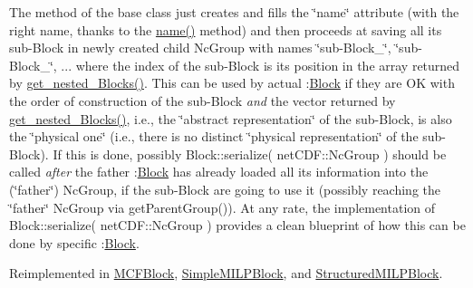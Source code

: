 The method of the base class just creates and fills the \char`\"{}name\char`\"{} attribute (with the right name, thanks to the \mbox{\hyperlink{class_s_m_spp__di__unipi__it_1_1_block_a738e9dfd6e00507da219e4bd5a3f6be9}{name()}} method) and then proceeds at saving all its sub-\/\+Block in newly created child Nc\+Group with names \char`\"{}sub-\/\+Block\+\_\char`\"{}, \char`\"{}sub-\/\+Block\+\_\char`\"{}, ... where the index of the sub-\/\+Block is its position in the array returned by \mbox{\hyperlink{class_s_m_spp__di__unipi__it_1_1_block_a39bc932e28075740f08b392830a67e03}{get\+\_\+nested\+\_\+\+Blocks()}}. This can be used by actual \+:\mbox{\hyperlink{class_s_m_spp__di__unipi__it_1_1_block}{Block}} if they are OK with the order of construction of the sub-\/\+Block {\itshape and} the vector returned by \mbox{\hyperlink{class_s_m_spp__di__unipi__it_1_1_block_a39bc932e28075740f08b392830a67e03}{get\+\_\+nested\+\_\+\+Blocks()}}, i.\+e., the \char`\"{}abstract representation\char`\"{} of the sub-\/\+Block, is also the \char`\"{}physical one\char`\"{} (i.\+e., there is no distinct \char`\"{}physical representation\char`\"{} of the sub-\/\+Block). If this is done, possibly Block\+::serialize( net\+C\+D\+F\+::\+Nc\+Group ) should be called {\itshape after} the father \+:\mbox{\hyperlink{class_s_m_spp__di__unipi__it_1_1_block}{Block}} has already loaded all its information into the (\char`\"{}father\char`\"{}) Nc\+Group, if the sub-\/\+Block are going to use it (possibly reaching the \char`\"{}father\char`\"{} Nc\+Group via get\+Parent\+Group()). At any rate, the implementation of Block\+::serialize( net\+C\+D\+F\+::\+Nc\+Group ) provides a clean blueprint of how this can be done by specific \+:\mbox{\hyperlink{class_s_m_spp__di__unipi__it_1_1_block}{Block}}. 

Reimplemented in \mbox{\hyperlink{class_s_m_spp__di__unipi__it_1_1_m_c_f_block_a1b39d46ae5259d58a1a1ed05af6c344d}{M\+C\+F\+Block}}, \mbox{\hyperlink{class_s_m_spp__di__unipi__it_1_1_simple_m_i_l_p_block_aefb3f33afdab2b6f4aef3f926c10df51}{Simple\+M\+I\+L\+P\+Block}}, and \mbox{\hyperlink{class_s_m_spp__di__unipi__it_1_1_structured_m_i_l_p_block_aefb3f33afdab2b6f4aef3f926c10df51}{Structured\+M\+I\+L\+P\+Block}}.

\mbox{\label{class_s_m_spp__di__unipi__it_1_1_block_a18d411b740a47db00d15083c5c7ef2ba}} 
